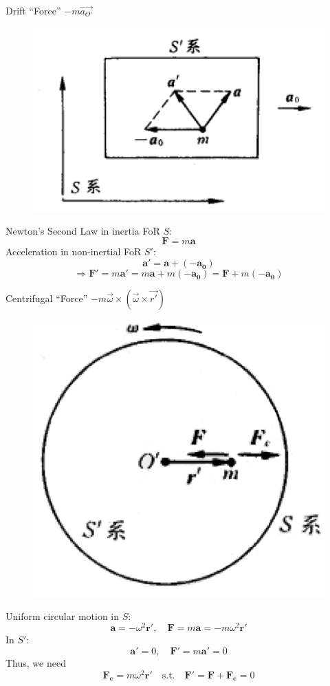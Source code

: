 \documentclass{beamer}
\begin{document}
\begin{frame}{Drift ``Force'' $-m\vec{a_{O'}}$}  
\begin{figure}[H]
\centering
\includegraphics[width=0.35 \linewidth, angle =0]{drift.png}
\label{fig:1}
\end{figure}
\pause
Newton's Second Law in inertia FoR $S$: 
$$\mathbf{F}=m\mathbf{a}$$\pause
Acceleration in non-inertial FoR $S'$:
$$\mathbf{a'} = \mathbf{a}+(-\mathbf{a_0})$$\pause
$$\Rightarrow \mathbf{F'}= m\mathbf{a'}=m\mathbf{a}+m(-\mathbf{a_0})=\mathbf{F}+m(-\mathbf{a_0})$$
\end{frame}

\begin{frame}{Centrifugal ``Force'' $-m\vec{\omega}\times(\vec{\omega}\times \vec{r'})$}
  \begin{figure}[htbp]
  \centering
  \includegraphics[width=0.25 \linewidth, angle =0]{centrifugal.png}
  \label{fig:2}
  \end{figure}\pause
  Uniform circular motion in $S:$
  $$
  \mathbf{a}=-\omega^2\mathbf{r'},\quad \mathbf{F} = m\mathbf{a}=-m\omega^2\mathbf{r'}
  $$\pause
  In $S'$:
  $$\mathbf{a'}=0,\quad \mathbf{F'}=m\mathbf{a'}=0$$\pause
  Thus, we need
  $$\mathbf{F_c}=m\omega^2\mathbf{r'}\quad\text{s.t.}\quad \mathbf{F'}=\mathbf{F}+\mathbf{F_c}=0$$
\end{frame}
\end{document}
